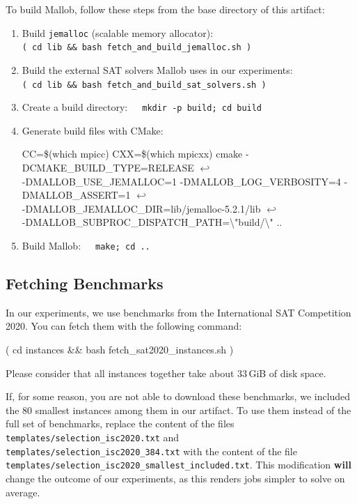 \documentclass[runningheads]{article}
\newcommand{\CR}{{\tiny$\hookleftarrow$}}
\numberwithin{dummy}{subsection}
\begin{document}
To build Mallob, follow these steps from the base directory of this artifact:
\begin{enumerate}
 \item Build \texttt{jemalloc} (scalable memory allocator):\\
 \texttt{( cd lib \&\& bash fetch\_and\_build\_jemalloc.sh )}
 \item Build the external SAT solvers Mallob uses in our experiments:\\
 \texttt{( cd lib \&\& bash fetch\_and\_build\_sat\_solvers.sh )}
 \item Create a build directory:\ \ \ \texttt{mkdir -p build; cd build}
 \item Generate build files with CMake:
 \begin{ttfenv}
 CC=\$(which mpicc) CXX=\$(which mpicxx) cmake -DCMAKE\_BUILD\_TYPE=RELEASE \CR\\
 \hspace*{0.3cm}-DMALLOB\_USE\_JEMALLOC=1 -DMALLOB\_LOG\_VERBOSITY=4 -DMALLOB\_ASSERT=1 \CR\\
 \hspace*{0.3cm}-DMALLOB\_JEMALLOC\_DIR=lib/jemalloc-5.2.1/lib \CR\\
 \hspace*{0.3cm}-DMALLOB\_SUBPROC\_DISPATCH\_PATH={\textbackslash}"build/{\textbackslash}" ..
 \end{ttfenv}
 \item Build Mallob:\ \ \ \texttt{make; cd ..}
\end{enumerate}

\subsection{Fetching Benchmarks}

In our experiments, we use benchmarks from the International SAT Competition 2020.
You can fetch them with the following command:
\begin{ttfenv}
( cd instances \&\& bash fetch\_sat2020\_instances.sh )
\end{ttfenv}
Please consider that all instances together take about 33$\,$GiB of disk space.

If, for some reason, you are not able to download these benchmarks, we included the 80 smallest instances among them in our artifact.
To use them instead of the full set of benchmarks, replace the content of the files \texttt{templates/selection\_isc2020.txt} and \texttt{templates/selection\_isc2020\_384.txt} with the content of the file \texttt{templates/selection\_isc2020\_smallest\_included.txt}.
This modification \textbf{will} change the outcome of our experiments, as this renders jobs simpler to solve on average.
\end{document}
